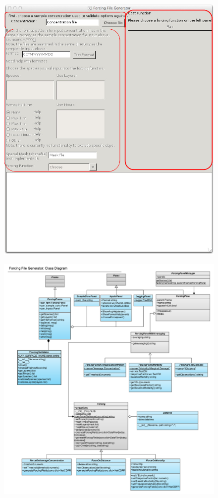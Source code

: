\documentclass{article}
\begin{document}
\begin{figure}
	\centering
	\includegraphics{Forcing_App_Layout.jpg}
\end{figure}

\begin{figure}
	\centering
	\includegraphics{Forcing_Generator.png}
\end{figure}
\end{document}
